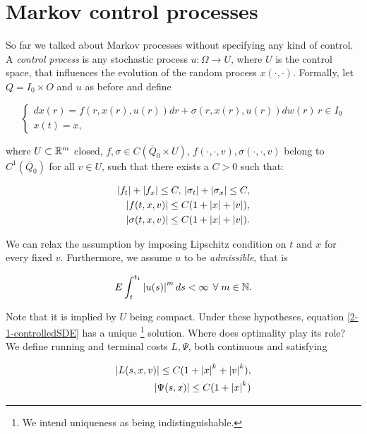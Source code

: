 \section{Markov control processes}

So far we talked about Markov processes without specifying any kind of control. A \textit{control process} is any 
stochastic process $u:\Omega\rightarrow U$, where $U$ is the control space, that influences the evolution of the random process $x(\cdot,\cdot)$. 
Formally, let $Q=I_0\times O$ and $u$ as before and define

\begin{equation}\label{2-1-controlledSDE}
    \begin{cases}
        dx(r) = f(r,x(r),u(r))dr + \sigma(r,x(r),u(r))dw(r)\,r\in I_0 \\
        x(t) = x,
    \end{cases}
\end{equation}

where $U\subset\mathbb{R}^m$ closed, $f,\sigma\in C(\overline{Q}_0\times U)$, $f(\cdot,\cdot,v),\sigma(\cdot,\cdot,v)$ belong to $C^1(\overline{Q}_0)$ for all $v\in U$, 
such that there exists a $C>0$ such that:

\begin{align}
        \abs{f_t}+\abs{f_x} \leq C,\,\abs{\sigma_t}+\abs{\sigma_x}\leq C, \\
        \abs{f(t,x,v)}\leq C(1+\abs{x}+\abs{v}), \\
        \abs{\sigma(t,x,v)}\leq C(1+\abs{x}+\abs{v}).
\end{align}

We can relax the assumption by imposing Lipschitz condition on $t$ and $x$ for every fixed $v$. Furthermore,
we assume $u$ to be \textit{admissible}, that is

\begin{equation}\label{2-1-condoncontrol}
    E\int_t^{t_1} \abs{u(s)}^m\,ds <\infty\,\forall m\in\mathbb{N}.
\end{equation}

Note that it is implied by $U$ being compact. Under these hypotheses, equation \eqref{2-1-controlledSDE} has a unique \footnote{We intend uniqueness as being indistinguishable.} solution. 
Where does optimality play its role? We define running and terminal costs $L,\Psi$, both continuous and satisfying

\begin{align}
    \abs{L(s,x,v)} \leq C(1+\abs{x}^k+\abs{v}^k), \\
    \abs{\Psi(s,x)} \leq C(1+\abs{x}^k)
\end{align}

